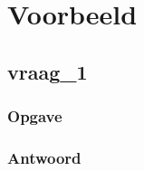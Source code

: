 \documentclass[linear_hashing.tex]{subfiles}
\begin{document}
\chapter{Voorbeeld}
\section{vraag\_1}
\subsection*{Opgave}
\subsection*{Antwoord}
\end{document}
